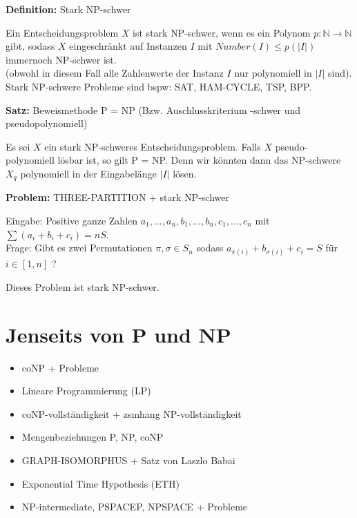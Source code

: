 \documentclass[a4paper,graphics,11pt]{article}
\begin{document}
\strut

\textbf{Definition:} Stark \textsf{NP}-schwer

Ein Entscheidungsproblem $X$ ist stark \textsf{NP}-schwer, wenn es ein Polynom $p : \mathbb{N}\to \mathbb{N}$
gibt, sodass $X$ eingeschränkt auf Instanzen $I$ mit $Number(I) \leq p(|I|)$ immernoch \textsf{NP}-schwer ist.\\
(obwohl in diesem Fall alle Zahlenwerte der Instanz $I$ nur polynomiell in $|I|$ sind).\\
Stark \textsf{NP}-schwere Probleme sind bspw: SAT, HAM-CYCLE, TSP, BPP.

\strut

\textbf{Satz:} Beweismethode \textsf{P = NP} (Bzw. Auschlusskriterium -schwer und pseudopolynomiell)

Es sei $X$ ein stark \textsf{NP}-schweres Entscheidungsproblem. Falls $X$ pseudo-polynomiell lösbar ist,
so gilt \textsf{P = NP}. Denn wir könnten dann das \textsf{NP}-schwere $X_q$ polynomiell in der Eingabelänge $|I|$
lösen.

\strut

\textbf{Problem:} THREE-PARTITION + stark \textsf{NP}-schwer

Eingabe: Positive ganze Zahlen $a_1,...,a_n,b_1,...,b_n,c_1,...,c_n$ mit $\sum (a_i+b_i+c_i) = nS$.\\[5pt]
Frage: Gibt es zwei Permutationen $\pi,\sigma \in S_n$ sodass $a_{\pi(i)} + b_{\sigma(i)} + c_i = S$
für $i \in [1,n]$ ?

Dieses Problem ist stark \textsf{NP}-schwer.

\newpage

\section{Jenseits von \textsf{P} und \textsf{NP}}

\begin{itemize}
    \item \textsf{coNP} + Probleme
    \item Lineare Programmierung (LP)
    \item \textsf{coNP}-vollständigkeit + zsmhang \textsf{NP}-vollständigkeit
    \item Mengenbeziehungen \textsf{P}, \textsf{NP}, \textsf{coNP}
    \item GRAPH-ISOMORPHUS + Satz von Laszlo Babai
    \item Exponential Time Hypothesis (ETH)
    \item \textsf{NP}-intermediate, \textsf{PSPACEP}, \textsf{NPSPACE} + Probleme
\end{itemize}
\end{document}
